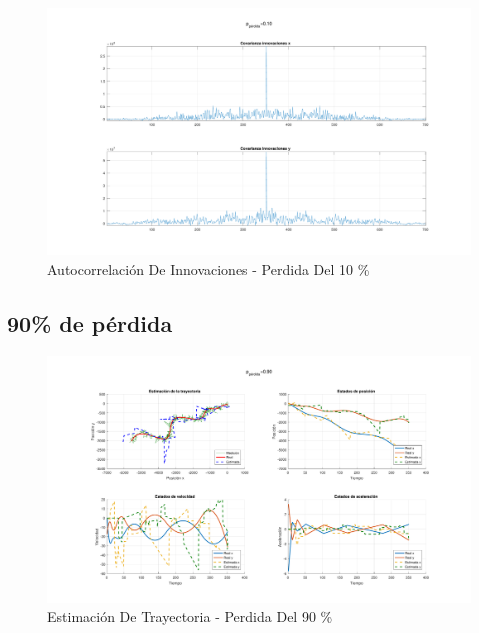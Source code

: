 	\begin{figure}[H]
		\centering
		\includegraphics[scale=0.5,trim={6,5cm 0 0 0}]{Figuras/covinn_ej7_1.pdf}
		\caption{Autocorrelación De Innovaciones - Perdida Del 10 \%}
		\label{fig:ej7_1_inov}
	\end{figure}
	
	\subsection{90\% de pérdida}
	\begin{figure}[H]
		\centering
		\includegraphics[scale=0.5,trim={6,5cm 0 0 0}]{Figuras/graf_ej7_2.pdf}
		\caption{Estimación De Trayectoria - Perdida Del 90 \%}
		\label{fig:ej7_2}
	\end{figure}

